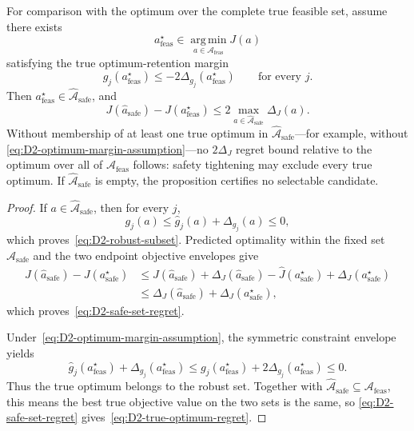 \begin{proposition}
For comparison with the optimum over the complete true feasible set, assume
there exists
\begin{equation}
  a_{\mathrm{feas}}^\star
  \in\operatorname*{arg\,min}_{a\in\mathcal A_{\mathrm{feas}}}J(a)
  \label{eq:D2-true-feasible-optimum}
\end{equation}
satisfying the true optimum-retention margin
\begin{equation}
  g_j(a_{\mathrm{feas}}^\star)
  \leq-2\Delta_{g_j}(a_{\mathrm{feas}}^\star)
  \qquad\text{for every }j.
  \label{eq:D2-optimum-margin-assumption}
\end{equation}
Then $a_{\mathrm{feas}}^\star\in
\widehat{\mathcal A}_{\mathrm{safe}}$, and
\begin{equation}
  J(\hat a_{\mathrm{safe}})-J(a_{\mathrm{feas}}^\star)
  \leq 2\max_{a\in\widehat{\mathcal A}_{\mathrm{safe}}}\Delta_J(a).
  \label{eq:D2-true-optimum-regret}
\end{equation}
Without membership of at least one true optimum in
$\widehat{\mathcal A}_{\mathrm{safe}}$---for example, without
\eqref{eq:D2-optimum-margin-assumption}---no $2\Delta_J$ regret bound relative
to the optimum over all of $\mathcal A_{\mathrm{feas}}$ follows: safety
tightening may exclude every true optimum.  If
$\widehat{\mathcal A}_{\mathrm{safe}}$ is empty, the proposition certifies no
selectable candidate.
\end{proposition}

\begin{proof}
If $a\in\widehat{\mathcal A}_{\mathrm{safe}}$, then for every $j$,
\[
  g_j(a)
  \leq\hat g_j(a)+\Delta_{g_j}(a)
  \leq0,
\]
which proves~\eqref{eq:D2-robust-subset}.  Predicted optimality within the
fixed set $\widehat{\mathcal A}_{\mathrm{safe}}$ and the two endpoint
objective envelopes give
\begin{align*}
  J(\hat a_{\mathrm{safe}})-J(a_{\mathrm{safe}}^\star)
  &\leq
  \hat J(\hat a_{\mathrm{safe}})+\Delta_J(\hat a_{\mathrm{safe}})
  -\hat J(a_{\mathrm{safe}}^\star)+\Delta_J(a_{\mathrm{safe}}^\star)\\
  &\leq
  \Delta_J(\hat a_{\mathrm{safe}})+\Delta_J(a_{\mathrm{safe}}^\star),
\end{align*}
which proves~\eqref{eq:D2-safe-set-regret}.

Under~\eqref{eq:D2-optimum-margin-assumption}, the symmetric constraint
envelope yields
\[
  \hat g_j(a_{\mathrm{feas}}^\star)
  +\Delta_{g_j}(a_{\mathrm{feas}}^\star)
  \leq
  g_j(a_{\mathrm{feas}}^\star)
  +2\Delta_{g_j}(a_{\mathrm{feas}}^\star)
  \leq0.
\]
Thus the true optimum belongs to the robust set.  Together with
$\widehat{\mathcal A}_{\mathrm{safe}}\subseteq\mathcal A_{\mathrm{feas}}$,
this means the best true objective value on the two sets is the same, so
\eqref{eq:D2-safe-set-regret} gives~\eqref{eq:D2-true-optimum-regret}.
\end{proof}

